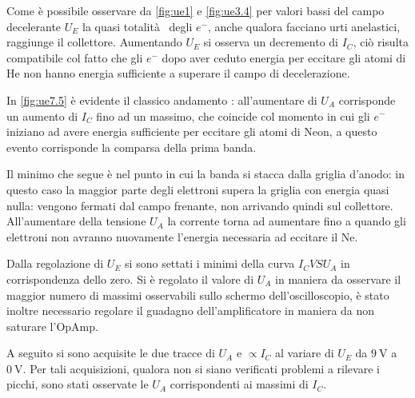 	Come è possibile osservare da \figurename{ \ref{fig:ue1}} e \figurename{ \ref{fig:ue3.4}}
	per valori bassi del campo decelerante $U_E$ la quasi totalità  degli $e^{-}$, anche qualora facciano
	urti anelastici, raggiunge il collettore.
	Aumentando $U_E$ si osserva un decremento
	di $I_C$, ciò risulta compatibile col fatto che gli $e^{-}$
	dopo aver ceduto energia per eccitare gli atomi di He
	non hanno energia sufficiente a superare il campo di decelerazione.

In \figurename{ \ref{fig:ue7.5}} è evidente il classico andamento  : all'aumentare di $U_A$ corrisponde un aumento di $I_C$ fino ad un massimo, che coincide col momento in cui gli $e^-$ iniziano ad avere energia sufficiente per eccitare gli atomi di Neon, a questo evento corrisponde la comparsa della prima banda.

	Il minimo che segue è nel punto in cui la banda si stacca dalla griglia d'anodo: in questo caso la maggior parte degli elettroni supera la griglia con energia quasi nulla: vengono fermati dal campo frenante, non arrivando quindi sul collettore.
	All'aumentare della tensione $U_A$ la corrente torna ad aumentare fino a quando gli elettroni non avranno nuovamente l'energia necessaria ad eccitare il Ne.

	Dalla regolazione di $U_E$ si sono settati i minimi della curva
	$I_C VS U_A$ in corrispondenza dello zero.
	Si è regolato il valore di $U_A$ in maniera da osservare il maggior
	numero di massimi osservabili sullo schermo dell'oscilloscopio,
	è stato inoltre necessario regolare il guadagno dell'amplificatore
	in maniera da non saturare l'OpAmp.

	A seguito si sono acquisite le due tracce di $U_A$ e $\propto I_C$ al variare di
	$U_E$ da $\SI{9}{\volt}$ a $\SI{0}{\volt}$. Per  tali acquisizioni, qualora non si siano
	verificati problemi a rilevare i picchi, sono stati
	osservate le $U_A$ corrispondenti ai massimi di $I_C$.



